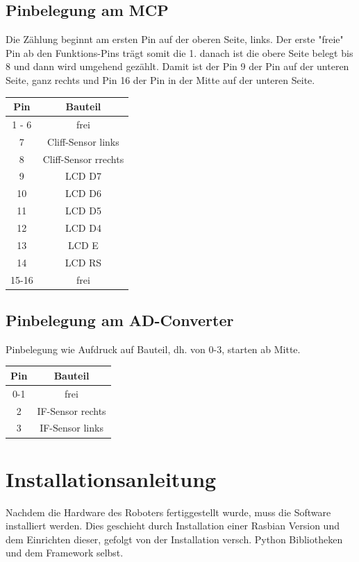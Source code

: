 \documentclass[twoside,12pt,a4paper]{report}
\begin{document}
	\section{Pinbelegung am MCP}
	Die Zählung beginnt am ersten Pin auf der oberen Seite, links. Der erste "freie" Pin ab den Funktions-Pins trägt somit die 1. danach ist die obere Seite belegt bis 8 und dann wird umgehend gezählt. Damit ist der Pin 9 der Pin auf der unteren Seite, ganz rechts und Pin 16 der Pin in der Mitte auf der unteren Seite. 
	
	\begin{center}
		\begin{tabular}{|c|c|}
			\hline
			Pin 	& Bauteil\\
			\hline
			1 - 6		&  frei\\
			7		& Cliff-Sensor links\\
			8		& Cliff-Sensor rrechts\\
			9		& LCD D7		\\
			10		& LCD D6 	\\
			11		& LCD D5		\\
			12		& LCD D4	\\
			13		& LCD E	\\	
			14		& LCD RS	\\
			15-16		& 	frei\\
			\hline
		\end{tabular}
	\end{center}
	
	\section{Pinbelegung am AD-Converter}
	Pinbelegung wie Aufdruck auf Bauteil, dh. von 0-3, starten ab Mitte.
	
	\begin{center}
		\begin{tabular}{|c|c|}
			\hline
			Pin 	& Bauteil\\
			\hline
			0-1		& 	frei\\
			2 		& IF-Sensor rechts\\
			3		& IF-Sensor links\\
			\hline
		\end{tabular}
	\end{center}
	
	\chapter{Installationsanleitung}
	Nachdem die Hardware des Roboters fertiggestellt wurde, muss die Software installiert werden. Dies geschieht durch Installation einer Rasbian Version und dem Einrichten dieser, gefolgt von der Installation versch. Python Bibliotheken und dem Framework selbst. 
\end{document}
